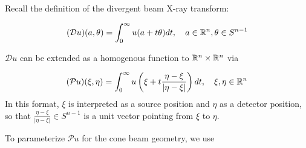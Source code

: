\documentclass[12pt]{article}
\begin{document}
Recall the definition of the divergent beam X-ray transform: 

\begin{align*}
(\mathcal{D} u)(a,\theta) = \int_0^\infty u(a+t\theta)dt,\quad a\in\mathbb{R}^n,\theta\in S^{n-1}
\end{align*}

$\mathcal{D}u$ can be extended as a homogenous function to $\mathbb{R}^n\times \mathbb{R}^n$ via 

\begin{align*}
(\mathcal{P}u)(\xi,\eta) = \int_0^\infty u\left(\xi+t\frac{\eta-\xi}{\vert \eta-\xi\vert}\right) dt ,\quad \xi,\eta\in\mathbb{R}^n
\end{align*} In this format, $\xi$ is interpreted as a source position and $\eta$ as a detector position, so that $\frac{\eta-\xi}{\vert \eta-\xi\vert}\in S^{n-1}$ is a unit vector pointing from $\xi$ to $\eta$.  

To parameterize $\mathcal{P}u$ for the cone beam geometry, we use 
\begin{align*}


\end{align*}
\end{document}
